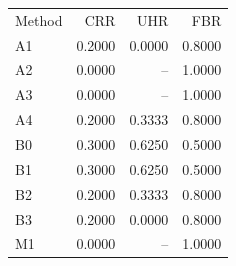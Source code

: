 \begin{tabular}{lrrr}
Method & CRR & UHR & FBR \\
A1 & 0.2000 & 0.0000 & 0.8000 \\
A2 & 0.0000 & -- & 1.0000 \\
A3 & 0.0000 & -- & 1.0000 \\
A4 & 0.2000 & 0.3333 & 0.8000 \\
B0 & 0.3000 & 0.6250 & 0.5000 \\
B1 & 0.3000 & 0.6250 & 0.5000 \\
B2 & 0.2000 & 0.3333 & 0.8000 \\
B3 & 0.2000 & 0.0000 & 0.8000 \\
M1 & 0.0000 & -- & 1.0000 \\
\end{tabular}
